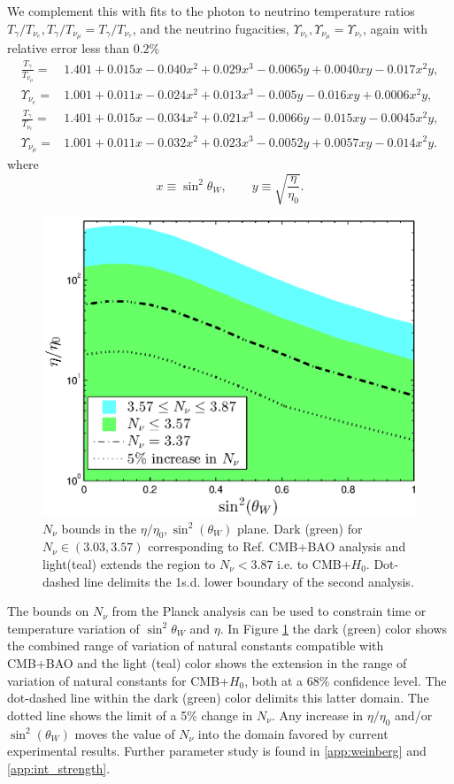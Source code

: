 We complement this with fits to the photon to neutrino temperature ratios $ T_\gamma / T_{\nu_e}, T_\gamma / T_{\nu_\mu}= T_\gamma / T_{\nu_\tau} $, and the neutrino fugacities, $\Upsilon_{\nu_e}, \Upsilon_{\nu_\mu}=\Upsilon_{\nu_\tau}$, again with relative error less than $0.2\%$  
\begin{align}
\frac{T_\gamma}{T_{\nu_\mu}}=&1.401+0.015x-0.040x^2+0.029x^3-0.0065y+0.0040xy-0.017x^2y, \label{fit1}\\
\Upsilon_{\nu_e}=&1.001+0.011x-0.024x^2+0.013x^3-0.005y-0.016xy+0.0006x^2y,\label{fit2}\\ 
\frac{T_\gamma}{T_{\nu_e}}=&1.401+0.015x-0.034x^2+0.021x^3-0.0066y-0.015xy-0.0045x^2y,\label{fit3}\\
\Upsilon_{\nu_\mu}=&1.001+0.011x-0.032x^2+0.023x^3-0.0052y+0.0057xy-0.014x^2y.\label{fit4}
\end{align}
where
\begin{equation}%
x\equiv \sin^2 \theta_W ,\qquad
y\equiv  \sqrt{\frac{\eta}{\eta_0}}.
\end{equation}%

\begin{figure}%
\centerline{\includegraphics[width=0.75\columnwidth]{03-birrell/ParametricStudies/region_plot_legend.eps}
}
\caption{$N_\nu$ bounds in the $\eta/\eta_0, \sin^2(\theta_W)$ plane. Dark (green) for $N_\nu\in (3.03,3.57)$ corresponding to Ref.\cite{Planck} CMB+BAO analysis and light(teal) extends the region to $N_\nu<3.87$ i.e. to CMB+$H_0$. Dot-dashed line delimits the 1s.d. lower boundary of the second analysis.}
\label{N_nu_domain}
 \end{figure}
The bounds on $N_\nu$ from the Planck analysis \cite{Planck} can be  used to constrain time or temperature variation of $\sin^2\theta_W$ and $\eta$.  
In  Figure \ref{N_nu_domain} the dark (green) color shows the combined range of  variation of natural constants  compatible with CMB+BAO and the light (teal) color shows  the extension in the range of  variation of  natural constants for CMB+$H_0$, both at a $68\%$ confidence level. The dot-dashed line within the dark (green) color  delimits   this latter domain. The dotted line shows the limit of a 5\% change in $N_\nu$.    Any increase in  $\eta/\eta_0$ and/or $\sin^2(\theta_W)$ moves the value of $N_\nu$ into the domain favored by current experimental results. Further parameter study is found in \ref{app:weinberg} and \ref{app:int_strength}.

